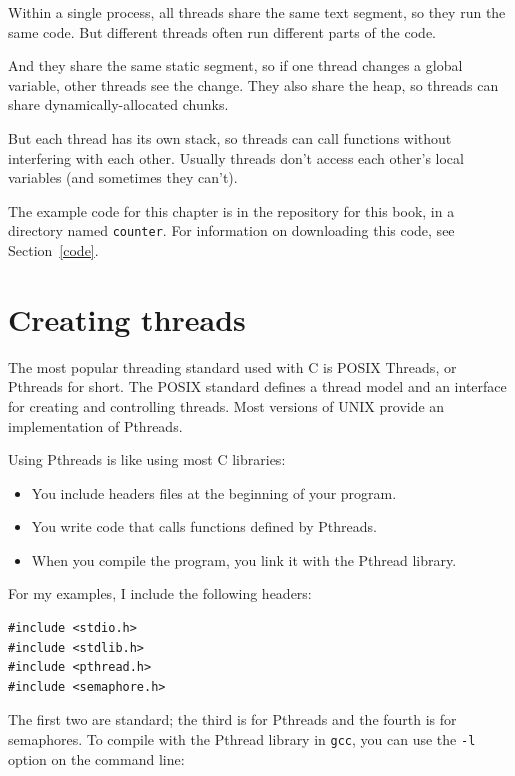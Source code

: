 \documentclass[12pt]{book}
\begin{document}
{Within a single process, all threads share the same text segment, so
they run the same code.  But different threads often run different parts
of the code.

And they share the same static segment, so if one thread changes a
global variable, other threads see the change.  They also share the heap,
so threads can share dynamically-allocated chunks.

But each thread has its own stack, so threads can call functions without
interfering with each other.  Usually threads don't access each
other's local variables (and sometimes they can't).

The example code for this chapter is in the repository for this book,
in a directory named {\tt counter}.  For information on downloading
this code, see Section~\ref{code}.


\section{Creating threads}

The most popular threading standard used with C is POSIX Threads, or Pthreads for short.  The POSIX standard defines a thread model and an interface for creating and controlling threads.  Most versions of UNIX provide an implementation of Pthreads.

Using Pthreads is like using most C libraries:

\begin{itemize}

\item You include headers files at the beginning of your
program.

\item You write code that calls functions defined by Pthreads.

\item When you compile the program, you link it with the Pthread library.

\end{itemize}

For my examples, I include the following headers:

\begin{verbatim}
#include <stdio.h>
#include <stdlib.h>
#include <pthread.h>
#include <semaphore.h>
\end{verbatim}

The first two are standard; the third is for Pthreads and
the fourth is for semaphores.  To compile with the Pthread library in {\tt gcc}, you can use the {\tt -l} option on the command line:

}
\end{document}
